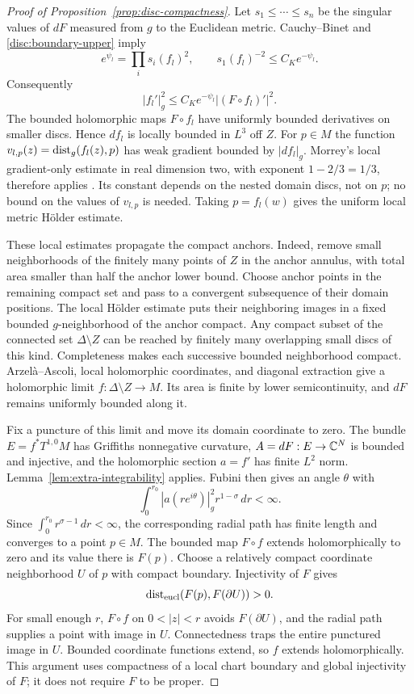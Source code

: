 \begin{proof}[Proof of Proposition~\ref{prop:disc-compactness}]
Let $s_1\le\cdots\le s_n$ be the singular values of $dF$ measured
from $g$ to the Euclidean metric.  Cauchy--Binet and
\eqref{disc:boundary-upper} imply
\[
 e^{\psi_l}=\prod_i s_i(f_l)^2,\qquad
 s_1(f_l)^{-2}\le C_K e^{-\psi_l}.
\]
Consequently
\begin{equation}\label{disc:inverse-jacobian}
 |f_l'|_g^2\le C_K e^{-\psi_l}|(F\circ f_l)'|^2.
\end{equation}
The bounded holomorphic maps $F\circ f_l$ have uniformly bounded
derivatives on smaller discs.  Hence $df_l$ is locally bounded in
$L^3$ off $Z$.  For $p\in M$ the function
$v_{l,p}(z)=\operatorname{dist}_g(f_l(z),p)$ has weak gradient bounded by
$|df_l|_g$.  Morrey's local gradient-only estimate in real dimension
two, with exponent $1-2/3=1/3$, therefore applies
\cite[Section~5.6.2, Theorem~4 and the Remark on p.~283]{EvansPDE}.
Its constant depends on the nested domain discs, not on $p$;
no bound on the values of $v_{l,p}$ is needed.
Taking $p=f_l(w)$ gives the uniform local metric H\"older estimate.

These local estimates propagate the compact anchors.  Indeed, remove
small neighborhoods of the finitely many points of $Z$ in the anchor
annulus, with total area smaller than half the anchor lower bound.
Choose anchor points in the remaining compact set and pass to a
convergent subsequence of their domain positions.  The local
H\"older estimate puts their neighboring images in a fixed bounded
$g$-neighborhood of the anchor compact.  Any compact subset of the
connected set $\Delta\setminus Z$ can be reached by finitely many
overlapping small discs of this kind.  Completeness makes each
successive bounded neighborhood compact.  Arzel\`a--Ascoli, local
holomorphic coordinates, and diagonal extraction give a holomorphic
limit $f:\Delta\setminus Z\to M$.  Its area is finite by lower
semicontinuity, and $dF$ remains uniformly bounded along it.

Fix a puncture of this limit and move its domain coordinate to zero.
The bundle $E=f^*T^{1,0}M$ has Griffiths nonnegative curvature,
$A=dF:E\to\mathbb C^N$ is bounded and injective, and the holomorphic
section $a=f'$ has finite $L^2$ norm.  Lemma~\ref{lem:extra-integrability}
applies.  Fubini then gives an angle $\theta$ with
\[
 \int_0^{r_0}|a(re^{i\theta})|_g^2r^{1-\sigma}\,dr<\infty.
\]
Since $\int_0^{r_0}r^{\sigma-1}\,dr<\infty$, the corresponding
radial path has finite length and converges to a point $p\in M$.
The bounded map $F\circ f$ extends holomorphically to zero and its
value there is $F(p)$.  Choose a relatively compact coordinate
neighborhood $U$ of $p$ with compact boundary.  Injectivity of $F$
gives
\[
 \operatorname{dist}_{\mathrm{eucl}}(F(p),F(\partial U))>0.
\]
For small enough $r$, $F\circ f$ on $0<|z|<r$ avoids
$F(\partial U)$, and the radial path supplies a point with image in
$U$.  Connectedness traps the entire punctured image in $U$.
Bounded coordinate functions extend, so $f$ extends holomorphically.
This argument uses compactness of a local chart boundary and global
injectivity of $F$; it does not require $F$ to be proper.


\end{proof}
